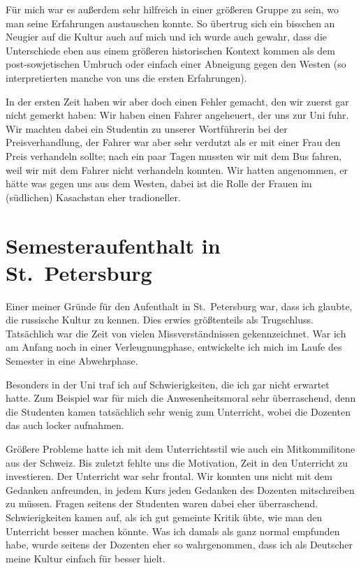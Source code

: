 \documentclass{../../sem_paper}
\begin{document}
Für mich war es außerdem sehr hilfreich in einer größeren Gruppe zu sein, wo man seine Erfahrungen austauschen konnte. 
So übertrug sich ein bisschen an Neugier auf die Kultur auch auf mich und ich wurde auch gewahr, dass die Unterschiede eben aus einem größeren historischen Kontext kommen als dem post-sowjetischen Umbruch oder einfach einer Abneigung gegen den Westen (so interpretierten manche von uns die ersten Erfahrungen).

In der ersten Zeit haben wir aber doch einen Fehler gemacht, den wir zuerst gar nicht gemerkt haben: 
Wir haben einen Fahrer angeheuert, der uns zur Uni fuhr. 
Wir machten dabei ein Studentin zu unserer Wortführerin bei der Preisverhandlung, der Fahrer war aber sehr verdutzt als er mit einer Frau den Preis verhandeln sollte; 
nach ein paar Tagen mussten wir mit dem Bus fahren, weil wir mit dem Fahrer nicht verhandeln konnten. 
Wir hatten angenommen, er hätte was gegen uns aus dem Westen, dabei ist die Rolle der Frauen im (südlichen) Kasachstan eher tradioneller.

\section{Semesteraufenthalt in St.\ Petersburg}
Einer meiner Gründe für den Aufenthalt in St.\ Petersburg war, dass ich glaubte, die russische Kultur zu kennen. Dies erwies größtenteils als Trugschluss. Tatsächlich war die Zeit von vielen Missverständnissen gekennzeichnet. War ich am Anfang noch in einer Verleugnungphase, entwickelte ich mich im Laufe des Semester in eine Abwehrphase.

Besonders in der Uni traf ich auf Schwierigkeiten, die ich gar nicht erwartet hatte. Zum Beispiel war für mich die Anwesenheitsmoral sehr überraschend, denn die Studenten kamen tatsächlich sehr wenig zum Unterricht, wobei die Dozenten das auch locker aufnahmen.

Größere Probleme hatte ich mit dem Unterrichtsstil wie auch ein Mitkommilitone aus der Schweiz. Bis zuletzt fehlte uns die Motivation, Zeit in den Unterricht zu investieren. Der Unterricht war sehr frontal. Wir konnten uns nicht mit dem Gedanken anfreunden, in jedem Kurs jeden Gedanken des Dozenten mitschreiben zu müssen. Fragen seitens der Studenten waren dabei eher überraschend. Schwierigkeiten kamen auf, als ich gut gemeinte Kritik übte, wie man den Unterricht besser machen könnte. Was ich damals als ganz normal empfunden habe, wurde seitens der Dozenten eher so wahrgenommen, dass ich als Deutscher meine Kultur einfach für besser hielt.
\end{document}
